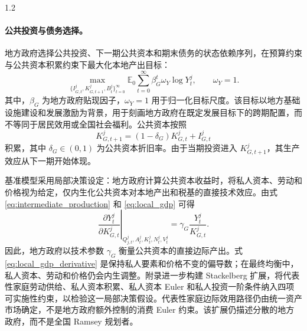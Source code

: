 \documentclass[12pt,UTF8]{ctexart}
\newcommand{\E}{\mathbb{E}}
\begin{document}
\begin{spacing}{1.2}
		\paragraph{公共投资与债务选择。}
		
		地方政府选择公共投资、下一期公共资本和期末债务的状态依赖序列，在预算约束与公共资本积累约束下最大化本地产出目标：
		\begin{equation}
			\max_{\{I_{G,t}^j,K_{G,t+1}^j,B_t^j\}_{t=0}^{\infty}}
			\E_0\sum_{t=0}^{\infty}\beta_G^t\omega_Y\log Y_t^j,
			\qquad \omega_Y=1.
			\label{eq:gov_objective}
		\end{equation}
		其中，$\beta_G$ 为地方政府贴现因子，$\omega_Y=1$ 用于归一化目标尺度。该目标以地方基础设施建设和发展激励为背景\cite{songxiong2026}，用于刻画地方政府在既定发展目标下的跨期配置，而不等同于居民效用或全国社会福利。公共资本按照
		\begin{equation}
			K_{G,t+1}^j=(1-\delta_G)K_{G,t}^j+I_{G,t}^j
			\label{eq:KG_law}
		\end{equation}
		积累，其中 $\delta_G\in(0,1)$ 为公共资本折旧率。由于当期投资进入 $K_{G,t+1}^j$，其生产效应从下一期开始体现。
		
		基准模型采用局部决策设定：地方政府计算公共资本收益时，将私人资本、劳动和价格视为给定，仅内生化公共资本对本地产出和税基的直接技术效应。由式 \eqref{eq:intermediate_production} 和 \eqref{eq:local_gdp} 可得
		\begin{equation}
			\left.
			\frac{\partial Y_t^j}{\partial K_{G,t}^j}
			\right|_{Q_{j,t}^j,A_t^j,K_t^j,N_t^j,V_t^j}
			=\gamma_G\frac{Y_t^j}{K_{G,t}^j}.
			\label{eq:local_gdp_derivative}
		\end{equation}
		因此，地方政府以技术参数 $\gamma_G$ 衡量公共资本的直接边际产出。式 \eqref{eq:local_gdp_derivative} 是保持私人要素和价格不变的偏导数；在最终均衡中，私人资本、劳动和价格仍会内生调整。附录进一步构建 Stackelberg 扩展，将代表性家庭劳动供给、私人资本积累、私人资本 Euler 和私人投资一阶条件纳入四项可实施性约束，以检验这一局部决策假设。代表性家庭边际效用路径仍由统一资产市场确定，不是地方政府额外控制的消费 Euler 约束。该扩展仍描述分散的地方政府，而不是全国 Ramsey 规划者。
		

\end{spacing}
\end{document}

